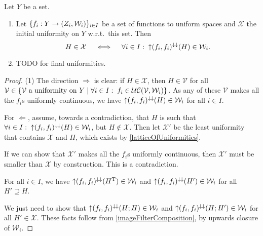 \begin{proposition} \label{initialFinalUniformity}
Let $Y$ be a set.
\begin{enumerate}
\item Let $\{f_i: Y\to \left( Z_i, \mathcal{W}_i \right)\}_{i\in I}$ be a set of functions to uniform spaces and $\mathcal{X}$ the initial uniformity on $Y$ w.r.t.\ this set. Then
\[ H\in \mathcal{X} \quad\iff\quad \forall i\in I: \; \operatorname{\uparrow}(f_i,f_i)^{\downarrow\downarrow}(H)\in \mathcal{W}_i. \]
\item TODO for final uniformities.
\end{enumerate}
\end{proposition}
\begin{proof}
(1) The direction $\Rightarrow$ is clear: if $H\in \mathcal{X}$, then $H\in \mathcal{V}$ for all $\mathcal{V}\in \left\{ \text{$\mathcal{V}$ a uniformity on $Y$} \;\middle|\; \forall i\in I:\; f_i\in \operatorname{\mathcal{UC}}(\mathcal{V}, \mathcal{W}_i) \right\}$. As any of these $\mathcal{V}$ makes all the $f_i$s uniformly continuous, we have $\operatorname{\uparrow}(f_i,f_i)^{\downarrow\downarrow}(H)\in \mathcal{W}_i$ for all $i\in I$.

For $\Leftarrow$, assume, towards a contradiction, that $H$ is such that $\forall i\in I: \; \operatorname{\uparrow}(f_i,f_i)^{\downarrow\downarrow}(H) \in \mathcal{W}_i$, but $H \notin \mathcal{X}$. Then let $\mathcal{X}'$ be the least uniformity that contains $\mathcal{X}$ and $H$, which exists by \ref{latticeOfUniformities}.

If we can show that $\mathcal{X}'$ makes all the $f_i$s uniformly continuous, then $\mathcal{X}'$ must be smaller than $\mathcal{X}$ by construction. This is a contradiction.

For all $i\in I$, we have $\operatorname{\uparrow}(f_i,f_i)^{\downarrow\downarrow}(H^{\mathrm{T}}) \in \mathcal{W}_i$ and $\operatorname{\uparrow}(f_i,f_i)^{\downarrow\downarrow}(H') \in \mathcal{W}_i$ for all $H'\supseteq H$.

We just need to show that $\operatorname{\uparrow}(f_i,f_i)^{\downarrow\downarrow}(H;H) \in \mathcal{W}_i$ and $\operatorname{\uparrow}(f_i,f_i)^{\downarrow\downarrow}(H;H') \in \mathcal{W}_i$ for all $H'\in \mathcal{X}$. These facts follow from \ref{imageFilterComposition}, by upwards closure of $\mathcal{W}_i$.
\end{proof}


